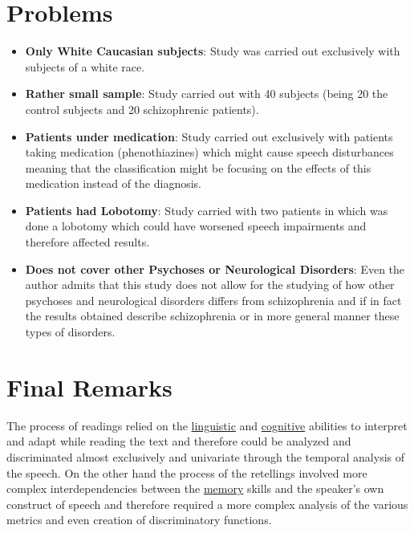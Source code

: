 \documentclass{Paper_Summary}
\begin{document}
\section{Problems}
    \begin{itemize}
        \item \textbf{Only White Caucasian subjects}: Study was carried out exclusively with subjects of a white race.
        \item \textbf{Rather small sample}: Study carried out with 40 subjects (being 20 the control subjects and 20 schizophrenic patients).
        \item \textbf{Patients under medication}: Study carried out exclusively with patients taking medication (phenothiazines) which might cause speech disturbances meaning that the classification might be focusing on the effects of this medication instead of the diagnosis.
        \item \textbf{Patients had Lobotomy}: Study carried with two patients in which was done a lobotomy which could have worsened speech impairments and therefore affected results.
        \item \textbf{Does not cover other Psychoses or Neurological Disorders}: Even the author admits that this study does not allow for the studying of how other psychoses and neurological disorders differs from schizophrenia and if in fact the results obtained describe schizophrenia or in more general manner these types of disorders.
    \end{itemize}


\section{Final Remarks}

    The process of readings relied on the \underline{linguistic} and \underline{cognitive} abilities to interpret and adapt while reading the text and therefore could be analyzed and discriminated almost exclusively and univariate through the temporal analysis of the speech. On the other hand the process of the retellings involved more complex interdependencies between the \underline{memory} skills and the speaker's own construct of speech and therefore required a more complex analysis of the various metrics and even creation of discriminatory functions.
\end{document}
